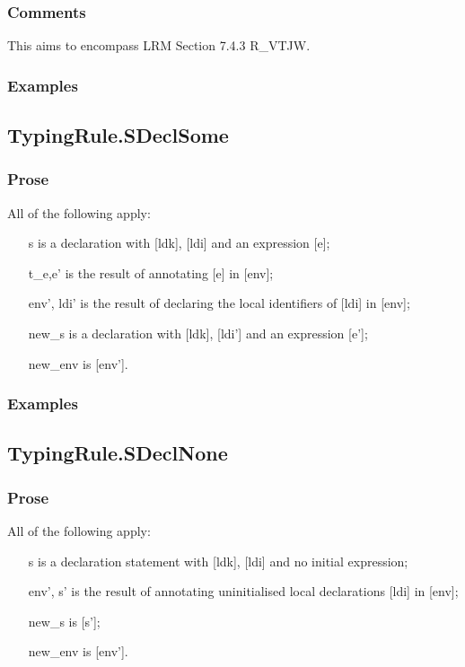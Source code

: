 \documentclass{book}
\begin{document}
    \subsubsection{Comments}
    This aims to encompass LRM Section 7.4.3 R\_VTJW.

    \subsubsection{Examples}

\subsection{TypingRule.SDeclSome}

    \subsubsection{Prose}
    All of the following apply:
   \begin{itemize}
   \item [s] is a declaration with [ldk], [ldi] and an expression [e];
   \item [t\_e,e'] is the result of annotating [e] in [env];
   \item [env', ldi'] is the result of declaring the local identifiers of [ldi] in [env];
   \item [new\_s] is a declaration with [ldk], [ldi'] and an expression [e'];
   \item [new\_env] is [env'].
   \end{itemize}

    \subsubsection{Examples}

\subsection{TypingRule.SDeclNone}

    \subsubsection{Prose}
    All of the following apply:
   \begin{itemize}
   \item [s] is a declaration statement with [ldk], [ldi] and no initial expression;
   \item [env', s'] is the result of annotating uninitialised local declarations [ldi] in [env];
   \item [new\_s] is [s'];
   \item [new\_env] is [env'].
   \end{itemize}
\end{document}
